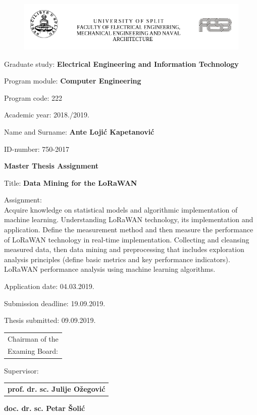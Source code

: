 
\thispagestyle{plain}

{
\begin{figure}
  \centering
  \includegraphics[width=1\linewidth]{assignment-header.png}
\end{figure}

Graduate study: \textbf{Electrical Engineering and Information Technology}

Program module: \textbf{Computer Engineering}

Program code: 222

Academic year: 2018./2019.

\vspace{1cm}

Name and Surname: \textbf{Ante Lojić Kapetanović}

ID-number: 750-2017

\vspace{1cm}

\begin{center}
  \textbf{\Large{Master Thesis Assignment}}
\end{center}

Title: \textbf{Data Mining for the LoRaWAN}

\vspace{1cm}

Assignment: \\Acquire knowledge on statistical models and algorithmic implementation of machine learning. 
Understanding LoRaWAN technology, its implementation and application. 
Define the measurement method and then measure the performance of LoRaWAN technology in real-time implementation. 
Collecting and cleansing measured data, then data mining and preprocessing that includes exploration analysis principles 
(define basic metrics and key performance indicators). 
LoRaWAN performance analysis using machine learning algorithms.

\vspace{1cm}

Application date: 04.03.2019.

Submission deadline: 19.09.2019.

\vspace{1cm}

Thesis submitted: 09.09.2019.

\vspace{1cm}

\begin{tabular}[b]{@{}l}
  Chairman of the\\ Examing Board:
\end{tabular}
\hfill
  Supervisor:\hspace{3cm}

\vspace{1.5cm}

\begin{tabular}[b]{@{}l}
  \textbf{prof. dr. sc. Julije Ožegović}
\end{tabular}
\hfill
  \textbf{doc. dr. sc. Petar Šolić}
}
